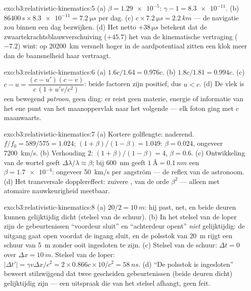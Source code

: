\begin{solution}{exo:b3:relativistic-kinematics:5}
(a) $\beta = \num{1.29e-5}$: $\gamma - 1 = \num{8.3e-11}$. (b)
$86400\,\unit{s} \times \num{8.3e-11} = \qty{7.2}{\micro s}$ per dag.
(c) $c \times \qty{7.2}{\micro s} = \qty{2.2}{km}$ --- de navigatie zou
binnen een dag bezwijken. (d) Het netto $+38\,\unit{\micro s}$ betekent
dat de zwaartekrachtsblauwverschuiving ($+45.7$) het van de kinematische
vertraging ($-7.2$) wint: op \qty{20200}{km} versnelt hoger in de
aardpotentiaal zitten een klok meer dan de baansnelheid haar vertraagt.
\end{solution}

\begin{solution}{exo:b3:relativistic-kinematics:6}
(a) $1.6c/1.64 = 0.976c$. (b) $1.8c/1.81 = 0.994c$. (c) $c - u =
\dfrac{(c - u')(c - v)}{c\,(1 + u'v/c^2)}$: beide factoren zijn
positief, dus $u < c$. (d) De vlek is een bewegend \emph{patroon}, geen
ding: er reist geen materie, energie of informatie van het ene punt van
het maanoppervlak naar het volgende --- elk foton ging met $c$ maanwaarts.
\end{solution}

\begin{solution}{exo:b3:relativistic-kinematics:7}
(a) Kortere golflengte: naderend. $f/f_0 = 589/575 = 1.024$;
$(1+\beta)/(1-\beta) = 1.049$: $\beta = 0.024$, ongeveer
\qty{7200}{km/s}. (b) Verhouding $2$: $(1+\beta)/(1-\beta) = 4$, $\beta =
0.6$. (c) Ontwikkeling van de wortel geeft $\Delta\lambda/\lambda \approx
\beta$; bij \qty{600}{nm} geeft $\qty{1}{\angstrom} = \qty{0.1}{nm}$ een
$\beta = \num{1.7e-4}$: ongeveer \qty{50}{km/s} per angström --- de
reflex van de astronoom. (d) Het transversale dopplereffect: zuivere
, van de orde $\beta^2$ --- alleen met atomaire nauwkeurigheid
meetbaar.
\end{solution}

\begin{solution}{exo:b3:relativistic-kinematics:8}
(a) $20/2 = \qty{10}{m}$: hij past, net, en beide deuren kunnen
gelijktijdig dicht (stelsel van de schuur). (b) In het stelsel van de
loper zijn de gebeurtenissen ``voordeur sluit'' en ``achterdeur opent''
\emph{niet} gelijktijdig: de uitgang gaat open voordat de ingang sluit,
en de polsstok van \qty{20}{m} rijgt een schuur van \qty{5}{m} zonder
ooit ingesloten te zijn. (c) Stelsel van de schuur: $\Delta t = 0$ over
$\Delta x =
\qty{10}{m}$. Stelsel van de loper: $|\Delta t'| = \gamma v\Delta x/c^2 =
2 \times 0.866c \times 10/c^2 = \qty{58}{ns}$. (d) ``De
polsstok is ingesloten'' beweert stilzwijgend dat twee gescheiden
gebeurtenissen (beide deuren dicht) gelijktijdig zijn --- een uitspraak
die van het stelsel afhangt, geen feit.
\end{solution}

